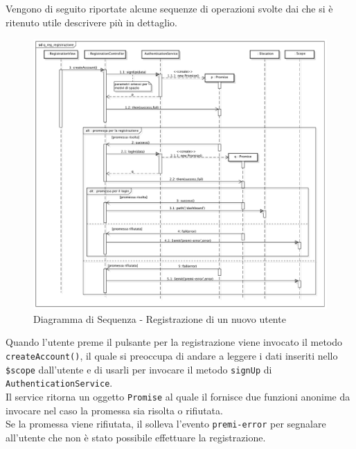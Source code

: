 \label{seqFrontEnd}
Vengono di seguito riportate alcune sequenze di operazioni svolte dai  che si è ritenuto utile descrivere più in dettaglio.
\begin{center}
\begin{figure}[h]
\centering
\includegraphics[scale=0.25,keepaspectratio]{diagrammi/sequenza/FrontEnd/controllers/q_reg_registrazione.pdf}
\caption{Diagramma di Sequenza - Registrazione di un nuovo utente}
\end{figure}
\end{center}
\FloatBarrier
Quando l'utente preme il pulsante per la registrazione viene invocato il metodo \texttt{createAccount()}, il quale si preoccupa di andare a leggere i dati inseriti nello \texttt{\$scope} dall'utente e di usarli per invocare il metodo \texttt{signUp} di \texttt{AuthenticationService}.\\
Il service ritorna un oggetto \texttt{Promise} al quale il  fornisce due funzioni anonime da invocare nel caso la promessa sia risolta o rifiutata.	\\
Se la promessa viene rifiutata, il  solleva l'evento \texttt{premi-error} per segnalare all'utente che non è stato possibile effettuare la registrazione. \\
